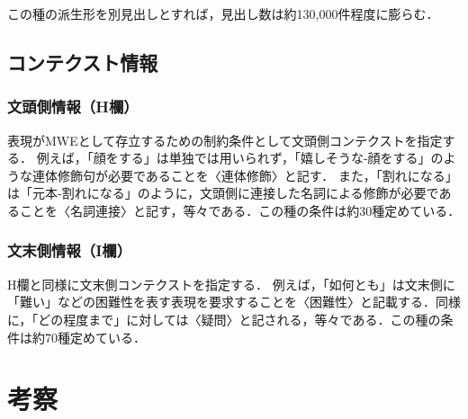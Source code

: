 \documentclass[japanese]{jnlp_1.4}
\begin{document}
この種の派生形を別見出しとすれば，見出し数は約130,000件程度に膨らむ．



\subsection{コンテクスト情報}

\subsubsection{文頭側情報（H欄）}

表現がMWEとして存立するための制約条件として文頭側コンテクストを指定する．
例えば，「顔をする」は単独では用いられず，「嬉しそうな-顔をする」のような連体修飾句が必要であることを〈連体修飾〉と記す．
また，「割れになる」は「元本-割れになる」のように，文頭側に連接した名詞による修飾が必要であることを〈名詞連接〉と記す，等々である．この種の条件は約30種定めている．

\subsubsection{文末側情報（I欄）}

H欄と同様に文末側コンテクストを指定する．
\pagebreak
例えば，「如何とも」は文末側に「難い」などの困難性を表す表現を要求することを〈困難性〉と記載する．同様に，「どの程度まで」に対しては〈疑問〉と記される，等々である．この種の条件は約70種定めている．


\section{考察}
\end{document}
